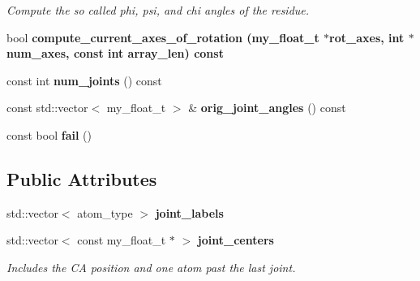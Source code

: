 \begin{CompactItemize}
\begin{CompactList}\small\item\em Compute the so called phi, psi, and chi angles of the residue. \item\end{CompactList}\item 
bool \bf{compute\_\-current\_\-axes\_\-of\_\-rotation} (my\_\-float\_\-t $\ast$rot\_\-axes, int $\ast$num\_\-axes, const int array\_\-len) const 
\item 
const int \textbf{num\_\-joints} () const \label{classSimSite3D_1_1residue__joints_6220137846303fb3cf73b4c02caaffd9}

\item 
const std::vector$<$ my\_\-float\_\-t $>$ \& \textbf{orig\_\-joint\_\-angles} () const \label{classSimSite3D_1_1residue__joints_45063f6a978d049bf4f5292b08241a93}

\item 
const bool \textbf{fail} ()\label{classSimSite3D_1_1residue__joints_fa5def7bc8d49c67da7ddc906f045c24}

\end{CompactItemize}
\subsection*{Public Attributes}
\begin{CompactItemize}
\item 
std::vector$<$ atom\_\-type $>$ \textbf{joint\_\-labels}\label{classSimSite3D_1_1residue__joints_61eee08b238efdfad0ec815eb47b0d26}

\item 
std::vector$<$ const my\_\-float\_\-t $\ast$ $>$ \bf{joint\_\-centers}\label{classSimSite3D_1_1residue__joints_a548886503607e03cdce112eb9ac92c9}

\begin{CompactList}\small\item\em Includes the CA position and one atom past the last joint. \item\end{CompactList}\end{CompactItemize}

